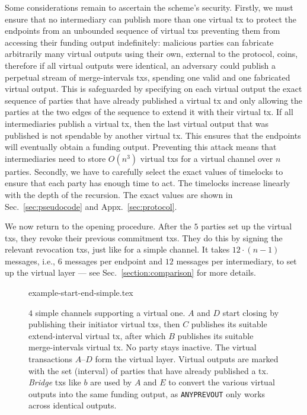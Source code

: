   Some considerations remain to ascertain the scheme's security.
  Firstly, we must ensure that no intermediary can publish more than
  one virtual tx to protect the endpoints from an unbounded sequence of virtual
  txs preventing them from accessing their funding output indefinitely:
  malicious parties can fabricate arbitrarily many virtual outputs using
  their own, external to the protocol, coins, therefore if all virtual outputs
  were identical, an adversary could publish a perpetual stream of
  merge-intervals txs, spending one valid and one fabricated virtual output.
  This is safeguarded by
  specifying on each virtual output the exact sequence of parties that have
  already published a virtual tx and only allowing the parties at the two edges
  of the sequence
  to extend it with their virtual tx. If all intermediaries publish a virtual
  tx, then the last virtual output that was published is not spendable by
  another virtual
  tx. This ensures that the endpoints will eventually obtain a funding
  output. Preventing this attack means that intermediaries need to store
  $O(n^3)$ virtual txs for a virtual channel over $n$ parties. Secondly,
  we have to carefully select the exact values of timelocks to ensure that
  each party has enough time to act. The timelocks increase linearly
  with the depth of the recursion. The exact values are shown in
  Sec.~\ref{sec:pseudocode} and Appx.~\ref{sec:protocol}.

  We now return to the opening procedure. After the $5$ parties set up the virtual txs, they revoke their previous
  commitment
  txs. They do this by signing the relevant revocation txs, just like
  for a simple channel. It takes $12 \cdot (n-1)$ messages, i.e., $6$ messages
  per endpoint and $12$ messages per intermediary, to set up the virtual layer
  --- see Sec.~\ref{section:comparison} for more details.

  \addtolength{\intextsep}{-15pt}
  \begin{figure*}
    \centering
    {example-start-end-simple.tex}
    \caption{$4$ simple channels supporting a virtual one. $A$ and $D$ start
    closing by publishing their initiator virtual txs, then $C$ publishes its
    suitable extend-interval virtual tx, after which $B$ publishes its suitable
    merge-intervals virtual tx. No party stays inactive. The virtual
    transactions $A$--$D$ form the virtual layer. Virtual outputs are marked
    with the set (interval) of parties that have already published a tx.
    \emph{Bridge} txs like $b$ are used by $A$ and $E$ to convert the various
    virtual outputs into the same funding output, as \texttt{ANYPREVOUT} only
    works across identical outputs.}
    \label{figure:example-start-end-simple}
  \end{figure*}
  \addtolength{\intextsep}{15pt}

